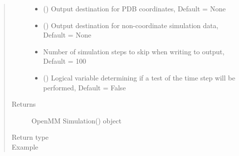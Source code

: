 \documentclass[letterpaper,12pt,english,openany,oneside]{sphinxmanual}
\begin{document}
\begin{fulllineitems}
\begin{quote}
\begin{description}
\begin{itemize}
\item {} 
 () \textendash{} Output destination for PDB coordinates, Default = None

\item {} 
 () \textendash{} Output destination for non-coordinate simulation data, Default = None

\item {} 
 \textendash{} Number of simulation steps to skip when writing to output, Default = 100

\item {} 
 () \textendash{} Logical variable determining if a test of the time step will be performed, Default = False

\end{itemize}

\item[{Returns}] \leavevmode
OpenMM Simulation() object

\item[{Return type}] \leavevmode



\item[{Example}] \leavevmode
\end{description}\end{quote}


\end{fulllineitems}
\end{document}
